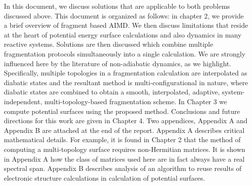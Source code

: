In this document, we discuss solutions that are applicable to both problems
discussed above. This document is organized as follows: in chapter 2, we provide
a brief overview of fragment based AIMD. We then discuss limitations that reside
at the heart of potential energy surface calculations and also dynamics in many
reactive systems. Solutions are then discussed which combine multiple fragmentation
protocols simultaneously into a single calculation. We are strongly influenced here
by the literature of non-adiabatic dynamics, as we highlight. Specifically,
multiple topologies in a fragmentation calculation are interpolated as diabatic
states and the resultant method is multi-configurational in nature, where
diabatic states are combined to obtain a smooth, interpolated, adaptive,
system-independent, multi-topology-based fragmentation scheme. In Chapter 3 we
compute potential surfaces using the proposed method. Conclusions and future
directions for this work are given in Chapter 4. Two appendices, Appendix A and
Appendix B are attached at the end of the report. Appendix A describes
critical mathematical details. For example, it is found in Chapter 2 that the
method of computing a multi-topology surface requires non-Hermitian matrices.
It is shown in Appendix A how the class of matrices used here are in fact
always have a real spectral span. Appendix B describes analysis of an
algorithm to reuse results of electronic structure calculations in
calculation of potential surfaces.
\newpage



